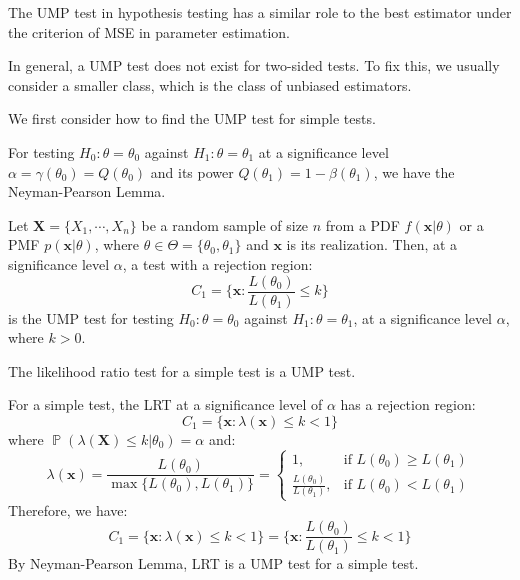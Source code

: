 \documentclass{huhtakm-template-book-v2}
\DeclareMathOperator{\prob}{\mathbb{P}}
\begin{document}
\begin{rem}
	The UMP test in hypothesis testing has a similar role to the best estimator under the criterion of MSE in parameter estimation.
\end{rem}
\begin{rem}
	In general, a UMP test does not exist for two-sided tests. To fix this, we usually consider a smaller class, which is the class of unbiased estimators.
\end{rem}
We first consider how to find the UMP test for simple tests.

For testing $H_{0}:\theta=\theta_{0}$ against $H_{1}:\theta=\theta_{1}$ at a significance level $\alpha=\gamma(\theta_{0})=Q(\theta_{0})$ and its power $Q(\theta_{1})=1-\beta(\theta_{1})$, we have the Neyman-Pearson Lemma.
\begin{lem}
	Let $\mathbf{X}=\{X_{1},\cdots,X_{n}\}$ be a random sample of size $n$ from a PDF $f(\mathbf{x}|\theta)$ or a PMF $p(\mathbf{x}|\theta)$, where $\theta\in\Theta=\{\theta_{0},\theta_{1}\}$ and $\mathbf{x}$ is its realization. Then, at a significance level $\alpha$, a test with a rejection region:
	\begin{equation*}
		C_{1}=\biggl\{\mathbf{x}:\frac{L(\theta_{0})}{L(\theta_{1})}\leq k\biggr\}
	\end{equation*}
	is the UMP test for testing $H_{0}:\theta=\theta_{0}$ against $H_{1}:\theta=\theta_{1}$, at a significance level $\alpha$, where $k>0$.
\end{lem}
\begin{thm}
	The likelihood ratio test for a simple test is a UMP test.
\end{thm}
\begin{proofing}
	For a simple test, the LRT at a significance level of $\alpha$ has a rejection region:
	\begin{equation*}
		C_{1}=\{\mathbf{x}:\lambda(\mathbf{x})\leq k<1\}
	\end{equation*}
	where $\prob(\lambda(\mathbf{X})\leq k|\theta_{0})=\alpha$ and:
	\begin{equation*}
		\lambda(\mathbf{x})=\frac{L(\theta_{0})}{\max\{L(\theta_{0}),L(\theta_{1})\}}=\begin{cases}
			1, &\text{if }L(\theta_{0})\geq L(\theta_{1})\\
			\frac{L(\theta_{0})}{L(\theta_{1})}, &\text{if }L(\theta_{0})<L(\theta_{1})
		\end{cases}
	\end{equation*}
	Therefore, we have:
	\begin{equation*}
		C_{1}=\{\mathbf{x}:\lambda(\mathbf{x})\leq k<1\}=\biggl\{\mathbf{x}:\frac{L(\theta_{0})}{L(\theta_{1})}\leq k<1\biggr\}
	\end{equation*}
	By Neyman-Pearson Lemma, LRT is a UMP test for a simple test.
\end{proofing}
\end{document}
